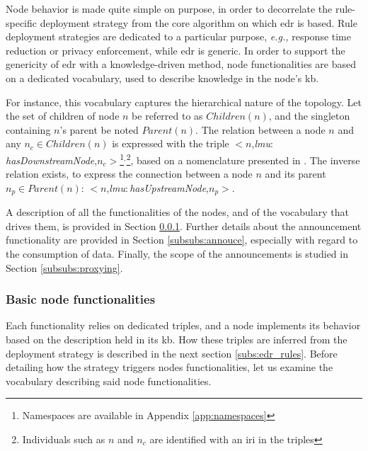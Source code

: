 \documentclass[sw]{iosart2x}
\newcommand{\namespace}[1]{\textit{#1$:$}}
\newcommand{\concept}[2]{\namespace{#1}\-\textit{#2}}
\newcommand{\triplet}[3]{$<$#1,\textit{#2},#3$>$}
\begin{document}
Node behavior is made quite simple on purpose, in order to decorrelate the rule-specific deployment strategy from the core algorithm on which \gls{edr} is based.
Rule deployment strategies are dedicated to a particular purpose, \textit{e.g.,} response time reduction or privacy enforcement, while \gls{edr} is generic.
In order to support the genericity of \gls{edr} with a knowledge-driven method, node functionalities are based on a dedicated vocabulary, used to describe knowledge in the node's \gls{kb}.

For instance, this vocabulary captures the hierarchical nature of the topology.
Let the set of children of node $n$ be referred to as $Children(n)$, and the singleton containing $n$'s parent be noted $Parent(n)$.
The relation between a node $n$ and any $n_c\in Children(n)$ is expressed with the triple \triplet{$n$}{\concept{lmu}{has\-Downstream\-Node}}{$n_c$}\footnote{Namespaces are available in Appendix \ref{app:namespaces}}$^,$\footnote{Individuals such as $n$ and $n_c$ are identified with an \gls{iri} in the triples}, based on a nomenclature presented in \cite{Seydoux2017}. 
The inverse relation exists, to express the connection between a node $n$ and its parent $n_p\in Parent(n)$: \triplet{$n$}{\concept{lmu}{has\-Upstream\-Node}}{$n_p$}.

A description of all the functionalities of the nodes, and of the vocabulary that drives them, is provided in Section \textsection \ref{subsubs:basic_functionalities}. 
Further details about the announcement functionality are provided in Section \textsection \ref{subsubs:annouce}, especially with regard to the consumption of data.
Finally, the scope of the announcements is studied in Section \textsection \ref{subsubs:proxying}.

\subsubsection{Basic node functionalities}
\label{subsubs:basic_functionalities}

Each functionality relies on dedicated triples, and a node implements its behavior based on the description held in its \gls{kb}.
How these triples are inferred from the deployment strategy is described in the next section \textsection \ref{subs:edr_rules}.
Before detailing how the strategy triggers nodes functionalities, let us examine the vocabulary describing said node functionalities.
\end{document}
